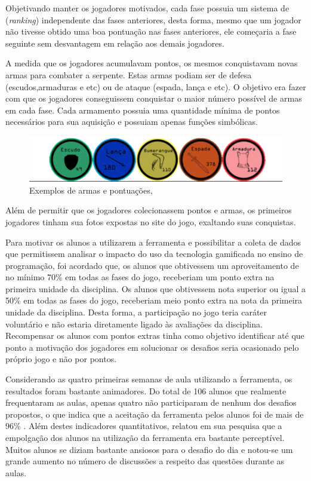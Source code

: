 Objetivando manter os jogadores motivados, cada fase possuia um sistema de (\textit{ranking}{\itshape}) independente
das fases anteriores, desta forma, mesmo que um jogador não tivesse obtido uma boa pontuação nas fases anteriores, ele
começaria a fase seguinte sem desvantagem em relação aos demais jogadores. 

A medida que os jogadores acumulavam pontos, os mesmos conquistavam novas armas para combater a serpente. Estas armas podiam
ser de defesa (escudos,armaduras e etc) ou de ataque (espada, lança e etc). O objetivo era fazer com que os jogadores conseguissem conquistar
o maior número possível de armas em cada fase. Cada armamento possuia uma quantidade mínima de pontos necessários para sua
aquisição e possuiam apenas funções simbólicas.

\begin{figure}[h]
	\centering
	\includegraphics[keepaspectratio=true,scale=0.45]{figuras/armas.png}
	\caption{Exemplos de armas e pontuações, }
	\label{figura2}
\end{figure}

Além de permitir que os jogadores colecionassem pontos e armas, os primeiros jogadores tinham sua fotos expostas no
site do jogo, exaltando suas conquistas.

Para motivar os alunos a utilizarem a ferramenta e possibilitar a coleta de dados que permitissem analisar o 
impacto do uso da tecnologia gamificada no ensino de programação, foi acordado que, os alunos que obtivessem 
um aproveitamento de no mínimo 70\% em todas as fases do jogo, receberiam um ponto extra na primeira unidade 
da disciplina. Os alunos que obtivessem nota superior ou igual a 50\% em todas as fases do jogo, receberiam 
meio ponto extra na nota da primeira unidade da disciplina. Desta forma, a participação no jogo teria caráter 
voluntário e não estaria diretamente ligado às avaliações da disciplina. Recompensar os alunos com pontos extras
tinha como objetivo identificar até que ponto a motivação dos jogadores em solucionar os desafios seria ocasionado
pelo próprio jogo e não por pontos.

Considerando as quatro primeiras semanas de aula utilizando a ferramenta, os resultados foram bastante animadores.
Do total de 106 alunos que realmente frequentaram as aulas, apenas quatro não participaram de nenhum dos desafios 
propostos, o que indica que a aceitação da ferramenta pelos alunos foi de mais de 96\% . Além destes indicadores 
quantitativos, \cite{raposo2016desafio} relatou em sua pesquisa que a empolgação dos alunos na utilização da 
ferramenta era bastante perceptível. Muitos alunos se diziam bastante ansiosos para o desafio do dia e notou-se um 
grande aumento no número de discussões a respeito das questões durante as aulas.

